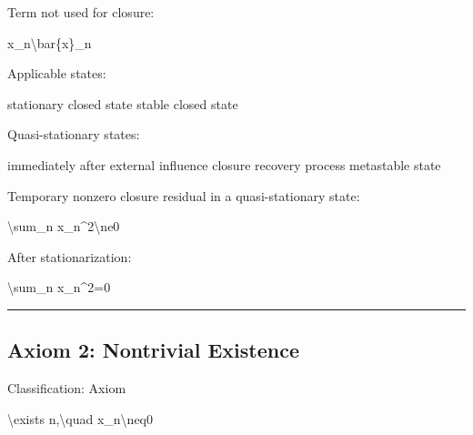 \documentclass[
  a4paper]{article}
\newenvironment{Shaded}{}{}
\newcommand{\NormalTok}[1]{#1}
\begin{document}
Term not used for closure:

\begin{Shaded}
\begin{Highlighting}[]
\NormalTok{x\_n\textbackslash{}bar\{x\}\_n}
\end{Highlighting}
\end{Shaded}

Applicable states:

\begin{Shaded}
\begin{Highlighting}[]
\NormalTok{stationary closed state}
\NormalTok{stable closed state}
\end{Highlighting}
\end{Shaded}

Quasi-stationary states:

\begin{Shaded}
\begin{Highlighting}[]
\NormalTok{immediately after external influence}
\NormalTok{closure recovery process}
\NormalTok{metastable state}
\end{Highlighting}
\end{Shaded}

Temporary nonzero closure residual in a quasi-stationary state:

\begin{Shaded}
\begin{Highlighting}[]
\NormalTok{\textbackslash{}sum\_n x\_n\^{}2\textbackslash{}ne0}
\end{Highlighting}
\end{Shaded}

After stationarization:

\begin{Shaded}
\begin{Highlighting}[]
\NormalTok{\textbackslash{}sum\_n x\_n\^{}2=0}
\end{Highlighting}
\end{Shaded}

\begin{center}\rule{0.5\linewidth}{0.5pt}\end{center}

\subsection{Axiom 2: Nontrivial
Existence}\label{axiom-2-nontrivial-existence}

Classification: Axiom

\begin{Shaded}
\begin{Highlighting}[]
\NormalTok{\textbackslash{}exists n,\textbackslash{}quad x\_n\textbackslash{}neq0}
\end{Highlighting}
\end{Shaded}
\end{document}
